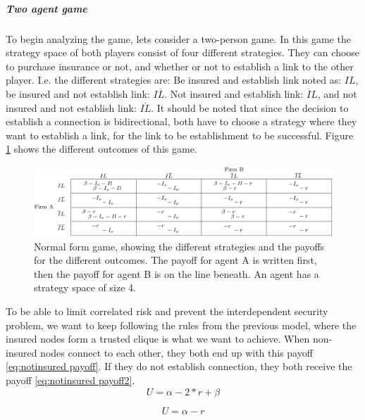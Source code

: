 \subparagraph{Two agent game}
To begin analyzing the game, lets consider a two-person game. In this game the strategy space of both players consist of four different strategies. They can choose to purchase insurance or not, and whether or not to establish a link to the other player. I.e. the different strategies are: Be insured and establish link noted as: $IL$, 
be insured and not establish link: $I\overline{L}$. Not insured and establish link: $\overline{I}L$, and not insured and not establish link: $\overline{IL}$. It should be noted that since the decision to establish a connection is bidirectional, both have to choose a strategy where they want to establish a link, for the link to be establishment to be successful.
Figure \ref{fig:FirstGameTheoryModel} shows the different outcomes of this game.

\begin{figure} %
\centering
\includegraphics[width=1.0\textwidth]{../Figures/FirstGameWithParameters.png}
\caption{\label{fig:FirstGameTheoryModel} Normal form game, showing the different strategies and the payoffs  for the different outcomes. The payoff for agent A is written first, then the payoff for agent B is on the line beneath.
 An agent has a strategy space of size 4. }

\end{figure}


To be able to limit correlated risk and prevent the interdependent security problem, we want to keep following the rules from the previous model, where the insured nodes form a trusted clique is what we want to achieve. 
When non-insured nodes connect to each other, they both end up with this payoff \ref{eq:notinsured payoff}. If they do not establish connection, they both receive the payoff \ref{eq:notinsured payoff2}.
\begin{equation}
U=\alpha - 2*r +\beta
\label{eq:notinsured payoff}
\end{equation}

\begin{equation}
U=\alpha - r
\label{eq:notinsured payoff2}
\end{equation}

